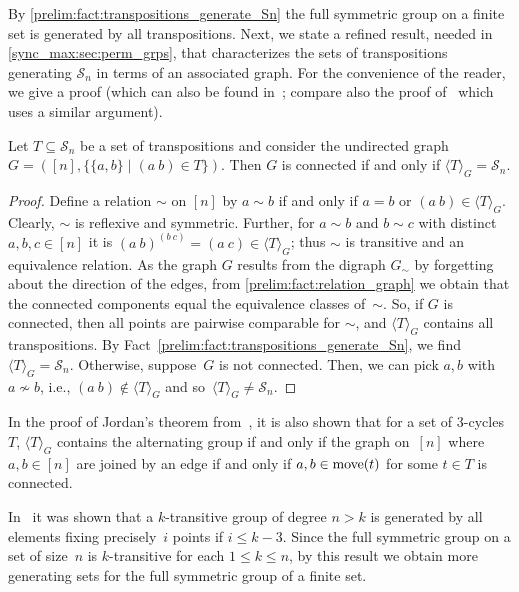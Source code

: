 By \cref{prelim:fact:transpositions_generate_Sn} the full symmetric group on a finite set
is generated by all transpositions. Next, we state a refined result, needed in \cref{sync_max:sec:perm_grps},
that characterizes the sets of transpositions generating $\mathcal S_n$ in terms of an associated graph. 
For the convenience of the reader, we give a proof (which can also be found in~\cite[Lem.~3.10.1]{godsil01};
compare also the proof of~\cite[Lem.~6(a)]{AraujoCameron2014}
which uses a similar argument).

\begin{proposition}
	\label{prop:connected_transpositions_gen_Sn}
	Let $T \subseteq \mathcal S_n$ be a set of transpositions
	and consider the undirected graph $G = ([n], \{ \{a,b\} \mid (a ~ b) \in T\})$.
	Then $G$ is connected if and only if $\langle T \rangle_G = \mathcal S_n$.
\end{proposition}
\begin{proof}
	Define a relation $\sim$ on $[n]$
	by $a \sim b$ if and only if $a = b$ or $(a ~ b) \in \langle T \rangle_G$.
	Clearly, $\sim$ is reflexive and symmetric.
	Further, for $a \sim b$ and $b \sim c$
	with distinct $a,b,c \in [n]$ it is $(a ~ b)^{(b ~ c)} = (a ~ c) \in \langle T \rangle_G$;
	thus $\sim$ is transitive and an equivalence relation.
	As the graph $G$ results from the digraph $G_{\sim}$ by forgetting
	about the direction of the edges, from \cref{prelim:fact:relation_graph}
	we obtain that the connected components equal the equivalence classes of~$\sim$.	
	So, if $G$ is connected, then all points are pairwise comparable for $\sim$, and
	$\langle T \rangle_G$ contains all transpositions.
	By Fact~\ref{prelim:fact:transpositions_generate_Sn}, we find $\langle T \rangle_G = \mathcal S_n$.
	Otherwise, suppose~$G$ is not connected.
	Then, we can pick $a,b$
	with $a \not\sim b$, i.e., $(a ~ b) \notin \langle T \rangle_G$
	and so~$\langle T \rangle_G \ne \mathcal S_n$.
\end{proof}

\begin{remark}	
	In the proof of Jordan's theorem from~\cite{IsaacsZ95},
	it is also shown that for a set of $3$-cycles $T$, $\langle T \rangle_G$ contains the alternating
	group if and only if the graph on~$[n]$
	where $a,b \in [n]$ are joined by an edge if and only if 
	$a,b \in \operatorname{move}(t)$ for some $t \in T$
	is connected.
\end{remark}

In~\cite{Knoerr2007} it was shown that a $k$-transitive group of degree $n > k$
is generated by all elements fixing precisely~$i$ points if $i \le k - 3$.
Since the full symmetric group on a set of size~$n$ is $k$-transitive for each $1 \le k \le n$,
by this result we obtain more generating sets for the full symmetric group of a finite set.

